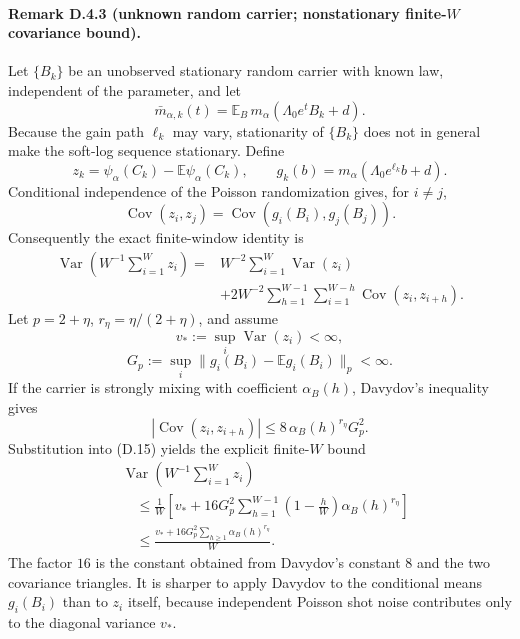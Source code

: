 \paragraph{Remark D.4.3 (unknown random carrier; nonstationary
finite-$W$ covariance bound).}
Let $\{B_k\}$ be an unobserved stationary random carrier with known
law, independent of the parameter, and let
\[
\bar m_{\alpha,k}(t)
=\mathbb E_B\,m_\alpha(\Lambda_0e^tB_k+d).
\]
Because the gain path $\ell_k$ may vary, stationarity of $\{B_k\}$
does not in general make the soft-log sequence stationary. Define
\[
z_k=\psi_\alpha(C_k)-\mathbb E\psi_\alpha(C_k),
\qquad
g_k(b)=m_\alpha(\Lambda_0e^{\ell_k}b+d).
\]
Conditional independence of the Poisson randomization gives, for
$i\ne j$,
\[
\operatorname{Cov}(z_i,z_j)
=\operatorname{Cov}(g_i(B_i),g_j(B_j)).
\]
Consequently the exact finite-window identity is
\[
\begin{aligned}
\operatorname{Var}\!\left(W^{-1}\sum_{i=1}^Wz_i\right)
={}&W^{-2}\sum_{i=1}^W\operatorname{Var}(z_i)\\
&+2W^{-2}\sum_{h=1}^{W-1}
\sum_{i=1}^{W-h}\operatorname{Cov}(z_i,z_{i+h}).
\end{aligned}
\tag{D.15}
\]
Let $p=2+\eta$, $r_\eta=\eta/(2+\eta)$, and assume
\[
v_*:=\sup_i\operatorname{Var}(z_i)<\infty,
\]
\[
G_p:=\sup_i\|g_i(B_i)-\mathbb Eg_i(B_i)\|_p<\infty.
\]
If the carrier is strongly mixing with coefficient $\alpha_B(h)$,
Davydov's inequality~\cite{Davydov1968} gives
\[
|\operatorname{Cov}(z_i,z_{i+h})|
\le8\,\alpha_B(h)^{r_\eta}G_p^2.
\]
Substitution into (D.15) yields the explicit finite-$W$ bound
\[
\begin{aligned}
&\operatorname{Var}\!\left(W^{-1}\sum_{i=1}^Wz_i\right)\\
&\quad\le
\frac1W\left[
v_*+16G_p^2\sum_{h=1}^{W-1}
\left(1-\frac hW\right)\alpha_B(h)^{r_\eta}
\right]\\
&\quad\le
\frac{v_*+16G_p^2\sum_{h\ge1}\alpha_B(h)^{r_\eta}}{W}.
\end{aligned}
\]
The factor $16$ is the constant obtained from Davydov's constant $8$
and the two covariance triangles. It is sharper to apply Davydov to
the conditional means $g_i(B_i)$ than to $z_i$ itself, because
independent Poisson shot noise contributes only to the diagonal
variance $v_*$.

